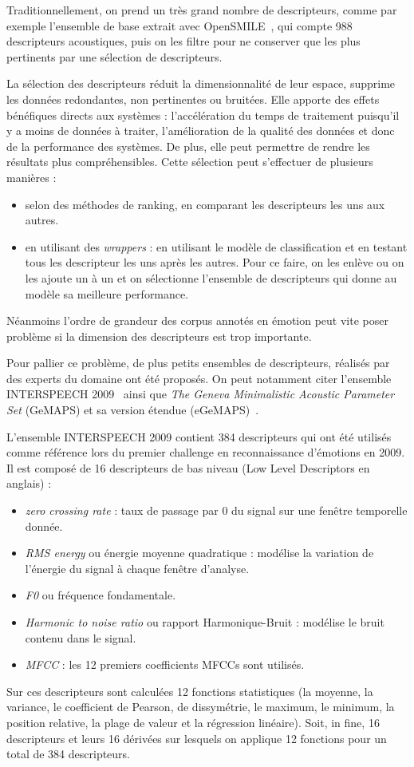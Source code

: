 Traditionnellement, on prend un très grand nombre de descripteurs, comme par exemple l'ensemble de base extrait avec OpenSMILE~\cite{OPENSMILE}, qui compte 988 descripteurs acoustiques, puis on les filtre pour ne conserver que les plus pertinents par une sélection de descripteurs.

La sélection des descripteurs réduit la dimensionnalité de leur espace, supprime les données redondantes, non pertinentes ou bruitées. Elle apporte des effets bénéfiques directs aux systèmes : l'accélération du temps de traitement puisqu'il y a moins de données à traiter, l'amélioration de la qualité des données et donc de la performance des systèmes. De plus, elle peut permettre de rendre les résultats plus compréhensibles.
Cette sélection peut s'effectuer de plusieurs manières :
\begin{itemize}
    \item selon des méthodes de ranking, en comparant les descripteurs les uns aux autres.
    \item en utilisant des \textit{wrappers} : en utilisant le modèle de classification et en testant tous les descripteur les uns après les autres. Pour ce faire, on les enlève ou on les ajoute un à un et on sélectionne l'ensemble de descripteurs qui donne au modèle sa meilleure performance.
\end{itemize}
Néanmoins l'ordre de grandeur des corpus annotés en émotion peut vite poser problème si la dimension des descripteurs est trop importante.

Pour pallier ce problème, de plus petits ensembles de descripteurs, réalisés par des experts du domaine ont été proposés. On peut notamment citer l'ensemble INTERSPEECH 2009~\cite{Schuller2009} ainsi que \textit{The Geneva Minimalistic Acoustic Parameter Set} (GeMAPS) et sa version étendue (eGeMAPS)~\cite{Eyben2016}.

L'ensemble INTERSPEECH 2009 contient 384 descripteurs qui ont été utilisés comme référence lors du premier challenge en reconnaissance d'émotions en 2009. Il est composé de 16 descripteurs de bas niveau (Low Level Descriptors en anglais) :
\begin{itemize}
  \item \textit{zero crossing rate} : taux de passage par 0 du signal sur une fenêtre temporelle donnée.
  \item \textit{RMS energy} ou énergie moyenne quadratique : modélise la variation de l’énergie du signal à chaque fenêtre d'analyse.
  \item \textit{F0} ou fréquence fondamentale.
  \item \textit{Harmonic to noise ratio} ou rapport Harmonique-Bruit : modélise le bruit contenu dans le signal.
  \item \textit{MFCC} : les 12 premiers coefficients MFCCs sont utilisés.
\end{itemize}
Sur ces descripteurs sont calculées 12 fonctions statistiques (la moyenne, la variance, le coefficient de Pearson, de dissymétrie, le maximum, le minimum, la position relative, la plage de valeur et la régression linéaire). Soit, in fine, 16 descripteurs et leurs 16 dérivées sur lesquels on applique 12 fonctions pour un total de 384 descripteurs.

